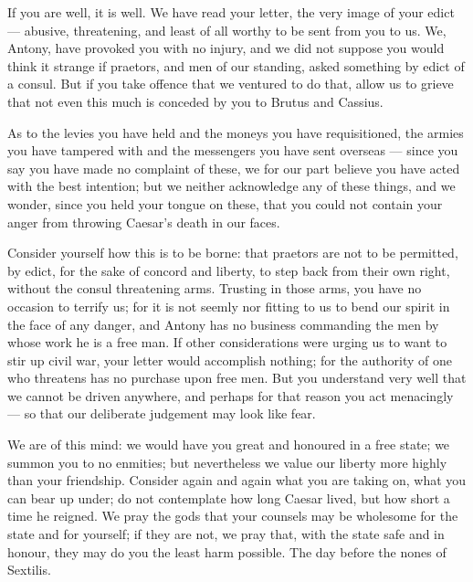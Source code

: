 

 If you are well, it is well. We have read your letter, the very image of your edict --- abusive, threatening, and least of all worthy to be sent from you to us. We, Antony, have provoked you with no injury, and we did not suppose you would think it strange if praetors, and men of our standing, asked something by edict of a consul. But if you take offence that we ventured to do that, allow us to grieve that not even this much is conceded by you to Brutus and Cassius.

 As to the levies you have held and the moneys you have requisitioned, the armies you have tampered with and the messengers you have sent overseas --- since you say you have made no complaint of these, we for our part believe you have acted with the best intention; but we neither acknowledge any of these things, and we wonder, since you held your tongue on these, that you could not contain your anger from throwing Caesar's death in our faces.

 Consider yourself how this is to be borne: that praetors are not to be permitted, by edict, for the sake of concord and liberty, to step back from their own right, without the consul threatening arms. Trusting in those arms, you have no occasion to terrify us; for it is not seemly nor fitting to us to bend our spirit in the face of any danger, and Antony has no business commanding the men by whose work he is a free man. If other considerations were urging us to want to stir up civil war, your letter would accomplish nothing; for the authority of one who threatens has no purchase upon free men. But you understand very well that we cannot be driven anywhere, and perhaps for that reason you act menacingly --- so that our deliberate judgement may look like fear.

 We are of this mind: we would have you great and honoured in a free state; we summon you to no enmities; but nevertheless we value our liberty more highly than your friendship. Consider again and again what you are taking on, what you can bear up under; do not contemplate how long Caesar lived, but how short a time he reigned. We pray the gods that your counsels may be wholesome for the state and for yourself; if they are not, we pray that, with the state safe and in honour, they may do you the least harm possible. The day before the nones of Sextilis.
